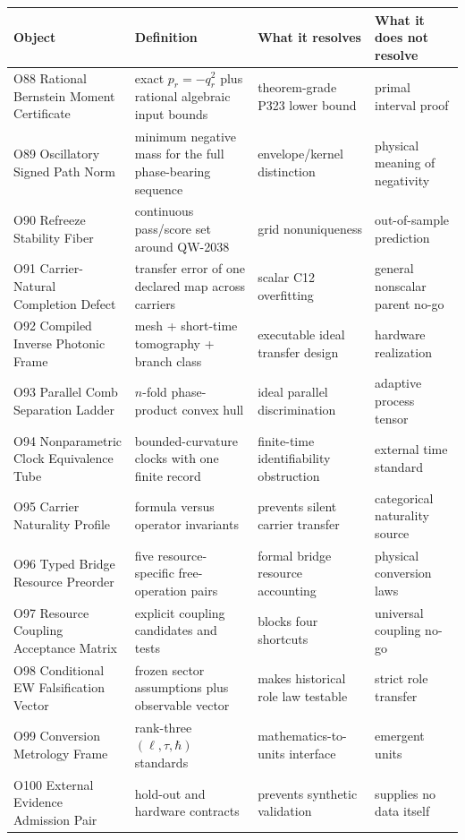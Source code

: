 \documentclass[11pt,a4paper,openany]{report}
\begin{document}
\begin{center}
\begingroup\small
\setlength{\tabcolsep}{2.5pt}
\renewcommand{\arraystretch}{1.16}
\begin{longtable}{@{}p{}p{}p{}p{}@{}}
\toprule
\textbf{Object} & \textbf{Definition} & \textbf{What it resolves} & \textbf{What it does not resolve} \\
\midrule
\endhead
O88 Rational Bernstein Moment Certificate & exact \(p_r=-q_r^2\) plus rational algebraic input bounds & theorem-grade P323 lower bound & primal interval proof \\
O89 Oscillatory Signed Path Norm & minimum negative mass for the full phase-bearing sequence & envelope/\allowbreak{}kernel distinction & physical meaning of negativity \\
O90 Refreeze Stability Fiber & continuous pass/\allowbreak{}score set around QW-2038 & grid nonuniqueness & out-of-sample prediction \\
O91 Carrier-Natural Completion Defect & transfer error of one declared map across carriers & scalar C12 overfitting & general nonscalar parent no-go \\
O92 Compiled Inverse Photonic Frame & mesh + short-time tomography + branch class & executable ideal transfer design & hardware realization \\
O93 Parallel Comb Separation Ladder & \(n\)-fold phase-product convex hull & ideal parallel discrimination & adaptive process tensor \\
O94 Nonparametric Clock Equivalence Tube & bounded-curvature clocks with one finite record & finite-time identifiability obstruction & external time standard \\
O95 Carrier Naturality Profile & formula versus operator invariants & prevents silent carrier transfer & categorical naturality source \\
O96 Typed Bridge Resource Preorder & five resource-specific free-operation pairs & formal bridge resource accounting & physical conversion laws \\
O97 Resource Coupling Acceptance Matrix & explicit coupling candidates and tests & blocks four shortcuts & universal coupling no-go \\
O98 Conditional EW Falsification Vector & frozen sector assumptions plus observable vector & makes historical role law testable & strict role transfer \\
O99 Conversion Metrology Frame & rank-three \((\ell,\tau,\hbar)\) standards & mathematics-to-units interface & emergent units \\
O100 External Evidence Admission Pair & hold-out and hardware contracts & prevents synthetic validation & supplies no data itself \\
\bottomrule
\end{longtable}
\endgroup
\end{center}
\end{document}
